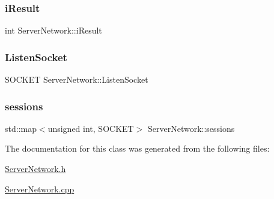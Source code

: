 \subsubsection{\texorpdfstring{i\+Result}{iResult}}
{\footnotesize\ttfamily int Server\+Network\+::i\+Result}

\mbox{\label{class_server_network_a903089768bbbfa891774eaaaf8ce79b7}} 
\subsubsection{\texorpdfstring{Listen\+Socket}{ListenSocket}}
{\footnotesize\ttfamily S\+O\+C\+K\+ET Server\+Network\+::\+Listen\+Socket}

\mbox{\label{class_server_network_a3acc0dabb1f7264874843ebd896a6d20}} 
\subsubsection{\texorpdfstring{sessions}{sessions}}
{\footnotesize\ttfamily std\+::map$<$unsigned int, S\+O\+C\+K\+ET$>$ Server\+Network\+::sessions}



The documentation for this class was generated from the following files\+:\begin{DoxyCompactItemize}
\item 
\mbox{\hyperlink{_server_network_8h}{Server\+Network.\+h}}\item 
\mbox{\hyperlink{_server_network_8cpp}{Server\+Network.\+cpp}}\end{DoxyCompactItemize}
